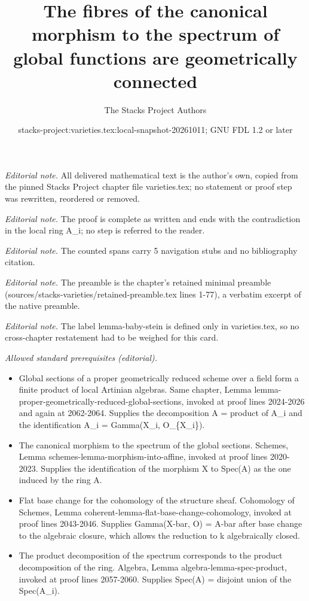 \documentclass[10pt,a4paper]{amsart}
\title{The fibres of the canonical morphism to the spectrum of global functions are geometrically connected}
\author{The Stacks Project Authors}
\date{stacks-project:varieties.tex:local-snapshot-20261011; GNU FDL 1.2 or later}
\theoremstyle{plain}
\theoremstyle{definition}
\theoremstyle{remark}
\numberwithin{equation}{subsection}
\begin{document}
\maketitle
\noindent\textit{Editorial note.} All delivered mathematical text is the author's own, copied from the pinned Stacks Project chapter file varieties.tex; no statement or proof step was rewritten, reordered or removed.\par\medskip
\noindent\textit{Editorial note.} The proof is complete as written and ends with the contradiction in the local ring A\_i; no step is referred to the reader.\par\medskip
\noindent\textit{Editorial note.} The counted spans carry 5 navigation stubs and no bibliography citation.\par\medskip
\noindent\textit{Editorial note.} The preamble is the chapter's retained minimal preamble (sources/stacks-varieties/retained-preamble.tex lines 1-77), a verbatim excerpt of the native preamble.\par\medskip
\noindent\textit{Editorial note.} The label lemma-baby-stein is defined only in varieties.tex, so no cross-chapter restatement had to be weighed for this card.\par\medskip
\noindent\textit{Allowed standard prerequisites (editorial).}\begin{itemize}
\item Global sections of a proper geometrically reduced scheme over a field form a finite product of local Artinian algebras. Same chapter, Lemma lemma-proper-geometrically-reduced-global-sections, invoked at proof lines 2024-2026 and again at 2062-2064. Supplies the decomposition A = product of A\_i and the identification A\_i = Gamma(X\_i, O\_\{X\_i\}).
\item The canonical morphism to the spectrum of the global sections. Schemes, Lemma schemes-lemma-morphism-into-affine, invoked at proof lines 2020-2023. Supplies the identification of the morphism X to Spec(A) as the one induced by the ring A.
\item Flat base change for the cohomology of the structure sheaf. Cohomology of Schemes, Lemma coherent-lemma-flat-base-change-cohomology, invoked at proof lines 2043-2046. Supplies Gamma(X-bar, O) = A-bar after base change to the algebraic closure, which allows the reduction to k algebraically closed.
\item The product decomposition of the spectrum corresponds to the product decomposition of the ring. Algebra, Lemma algebra-lemma-spec-product, invoked at proof lines 2057-2060. Supplies Spec(A) = disjoint union of the Spec(A\_i).
\end{itemize}\medskip
\end{document}
